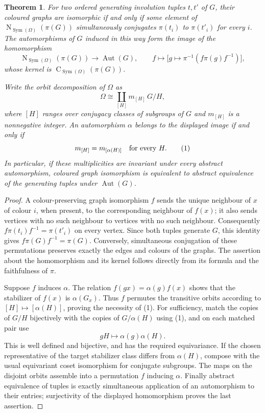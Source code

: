 \documentclass[11pt,a4paper]{article}
\newtheorem{theorem}{Theorem}
\newcommand{\Aut}{\operatorname{Aut}}
\newcommand{\Sym}{\operatorname{Sym}}
\newcommand{\N}{\operatorname{N}}
\newcommand{\C}{\operatorname{C}}
\begin{document}
\begin{theorem}\label{main}
For two ordered generating involution tuples $t,t'$ of $G$, their
coloured graphs are isomorphic if and only if some element of
$\N_{\Sym(\Omega)}(\pi(G))$ simultaneously conjugates
$\pi(t_i)$ to $\pi(t'_i)$ for every $i$. The automorphisms of $G$
induced in this way form the image of the homomorphism
\[
 \N_{\Sym(\Omega)}(\pi(G))\longrightarrow\Aut(G),
 \qquad f\longmapsto\bigl[g\mapsto\pi^{-1}(f\pi(g)f^{-1})\bigr],
\]
whose kernel is $\C_{\Sym(\Omega)}(\pi(G))$.

Write the orbit decomposition of $\Omega$ as
\[
       \Omega\cong\coprod_{[H]}m_{[H]}\,G/H,
\]
where $[H]$ ranges over conjugacy classes of subgroups of $G$ and
$m_{[H]}$ is a nonnegative integer. An automorphism $\alpha$ belongs
to the displayed image if and only if
\[
                   m_{[H]}=m_{[\alpha(H)]}\quad\hbox{for every }H.
                                                        \tag{1}
\]
In particular, if these multiplicities are invariant under every
abstract automorphism, coloured graph isomorphism is equivalent to
abstract equivalence of the generating tuples under $\Aut(G)$.
\end{theorem}
\begin{proof}
A colour-preserving graph isomorphism $f$ sends the unique neighbour
of $x$ of colour $i$, when present, to the corresponding neighbour of
$f(x)$; it also sends vertices with no such neighbour to vertices with
no such neighbour. Consequently
$f\pi(t_i)f^{-1}=\pi(t'_i)$ on every vertex. Since both tuples
generate $G$, this identity gives $f\pi(G)f^{-1}=\pi(G)$.
Conversely, simultaneous conjugation of these permutations preserves
exactly the edges and colours of the graphs. The assertion about the
homomorphism and its kernel follows directly from its formula and
the faithfulness of $\pi$.

Suppose $f$ induces $\alpha$. The relation
$f(gx)=\alpha(g)f(x)$ shows that the stabilizer of $f(x)$ is
$\alpha(G_x)$. Thus $f$ permutes the transitive orbits according
to $[H]\mapsto[\alpha(H)]$, proving the necessity of (1).
For sufficiency, match the copies of $G/H$ bijectively with the
copies of $G/\alpha(H)$ using (1), and on each matched pair use
\[
                         gH\longmapsto\alpha(g)\alpha(H).
\]
This is well defined and bijective, and has the required equivariance.
If the chosen representative of the target stabilizer class differs
from $\alpha(H)$, compose with the usual equivariant coset
isomorphism for conjugate subgroups. The maps on the disjoint orbits
assemble into a permutation $f$ inducing $\alpha$. Finally abstract
equivalence of tuples is exactly simultaneous application of an
automorphism to their entries; surjectivity of the displayed
homomorphism proves the last assertion.
\end{proof}
\end{document}
